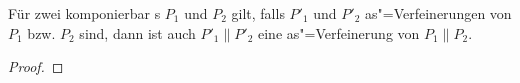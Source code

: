 \begin{Kor}
  \label{verfParallelKor}
  Für zwei komponierbar \MEIO{}s $P_1$ und $P_2$ gilt, falls $P'_1$ und $P'_2$
  as"=Verfeinerungen von $P_1$ bzw. $P_2$ sind, dann ist auch $P'_1\|P'_2$ eine
  as"=Verfeinerung von $P_1\|P_2$.
\end{Kor}
\begin{proof}

\end{proof}

